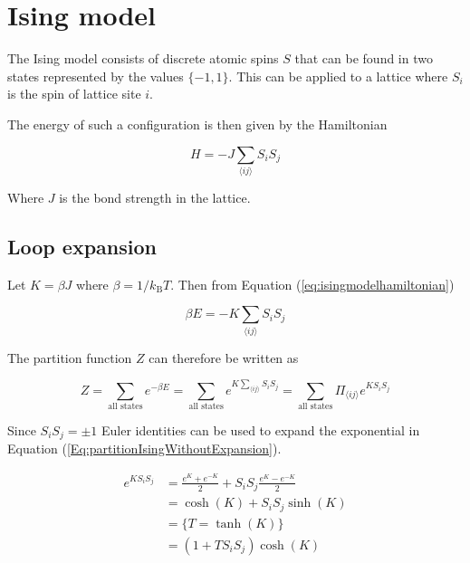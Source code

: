 \section{Ising model}

The Ising model consists of discrete atomic spins $S$ that can be found in two states represented by the values $\{-1, 1\}$. This can be applied to a lattice where $S_i$ is the spin of lattice site $i$.

The energy of such a configuration is then given by the Hamiltonian

\begin{equation}
    H = - J \sum_{\langle ij \rangle} S_i S_j
\label{eq:isingmodelhamiltonian}
\end{equation}

Where $J$ is the bond strength in the lattice.

\subsection{Loop expansion}
\label{subsec:IsingLoopExpansion}

Let $K = \beta J$ where $\beta = 1/k_{\text{B}} T$. Then from Equation (\ref{eq:isingmodelhamiltonian})

\begin{equation}
    \beta E = - K \sum_{\langle ij \rangle} S_i S_j
\end{equation}

The partition function $Z$ can therefore be written as

\begin{equation}
    Z = \sum_{\text{all states}} e^{-\beta E} = \sum_{\text{all states}} e^{K \sum_{\langle ij \rangle} S_i S_j} = \sum_{\text{all states}} \Pi_{\langle ij \rangle} e^{K S_i S_j}
\label{Eq:partitionIsingWithoutExpansion}
\end{equation}

Since $S_i S_j = \pm 1$ Euler identities can be used to expand the exponential in Equation (\ref{Eq:partitionIsingWithoutExpansion}).

\begin{align*}
    e^{KS_i S_j} &= \frac{e^K + e^{-K}}{2} + S_i S_j \frac{e^K - e^{-K}}{2} \\
    &= \cosh (K) + S_i S_j \sinh(K) \\
    &= \{ T = \tanh(K) \} \\
    &= (1 + T S_i S_j) \cosh(K)
\end{align*}

